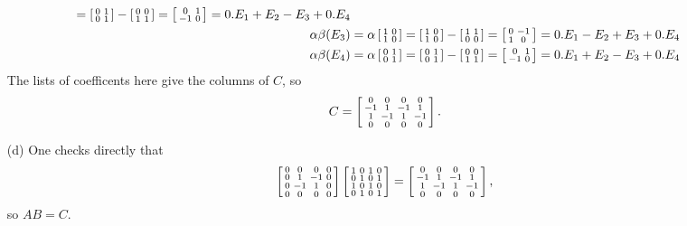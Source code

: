 \begin{itemize}
\begin{align*}
                 =\bsm 0&1\\0&1\esm -\bsm 0&0\\1&1\esm
                 =\bsm 0&1\\-1&0\esm = 0.E_1+E_2 - E_3+0.E_4 \\
    \al\bt(E_3) &=\al\bsm 1&0\\1&0\esm
                 =\bsm 1&0\\1&0\esm -\bsm 1&1\\0&0\esm
                 =\bsm 0&-1\\1&0\esm = 0.E_1-E_2 + E_3+0.E_4 \\
    \al\bt(E_4) &=\al\bsm 0&1\\0&1\esm
                 =\bsm 0&1\\0&1\esm -\bsm 0&0\\1&1\esm
                 =\bsm 0&1\\-1&0\esm = 0.E_1+E_2 - E_3+0.E_4
   \end{align*}
   The lists of coefficents here give the columns of $C$,
   so
   {\tiny \[
     C = \bsm 0&0&0&0 \\ -1&1&-1&1 \\ 1&-1&1&-1\\ 0&0&0&0 \esm.
   \]}
  \item[(d)] One checks directly that
   {\tiny \[
     \bsm 0&0&0&0 \\ 0&1&-1&0 \\ 0&-1&1&0\\ 0&0&0&0 \esm
     \bsm 1&0&1&0 \\ 0&1&0&1 \\ 1&0&1&0\\ 0&1&0&1 \esm =
     \bsm 0&0&0&0 \\ -1&1&-1&1 \\ 1&-1&1&-1\\ 0&0&0&0 \esm,
   \]}
   so $AB=C$.
 \end{itemize}
\EndDeferredSolution

